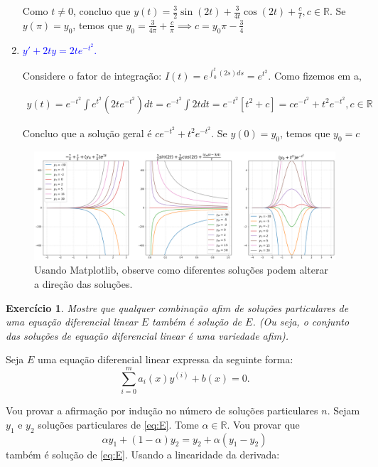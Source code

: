 \documentclass[a4paper,12pt]{article}
\theoremstyle{exer}
\newtheorem{exercise}{Exercício}
\theoremstyle{definition}
\newcommand{\enu}[1]{\textcolor{blue}{#1}}
\begin{document}
\begin{enumerate}
    Como $t \neq 0$, concluo que $y(t) = \frac{3}{2}\sin(2t) + \frac{3}{4t}\cos(2t) + \frac{c}{t}, c \in \mathbb{R}$.  Se $y(\pi) = y_0$, temos que $y_0 = \frac{3}{4\pi} + \frac{c}{\pi} \implies c = y_0\pi - \frac{3}{4}$ 


    \item \enu{$y' +2ty = 2te^{-t^2}$. }
    
    Considere o fator de integração: $I(t) = e^{\int_0^t (2s)ds} = e^{t^2}$. Como fizemos em a, 

    \begin{align}
    y(t) = e^{-t^2} \int e^{t^2}(2te^{-t^2})dt = e^{-t^2} \int 2t dt = e^{-t^2}[t^2 + c] = ce^{-t^2} + t^2e^{-t^2}, c \in \mathbb{R}
    \end{align}

    Concluo que a solução geral é $ce^{-t^2} + t^2e^{-t^2}$. Se $y(0) = y_0$, temos que $y_0 = c$

\end{enumerate}

\begin{figure}
    \centering
    \includegraphics[width=\textwidth]{images/exercise2.png}
    \caption{Usando Matplotlib, observe como diferentes soluções podem alterar a direção das soluções.}
\end{figure}

\begin{exercise}
    Mostre que qualquer combinação afim de soluções particulares de uma
    equação diferencial linear $E$ também é solução de $E$. (Ou seja, o
    conjunto das soluções de equação diferencial linear é uma variedade afim).
\end{exercise}

Seja $E$ uma equação diferencial linear expressa da seguinte forma:
\begin{equation}
    \label{eq:E}
    \sum_{i= 0}^m a_i(x)y^{(i)} + b(x) = 0.
\end{equation}

Vou provar a afirmação por indução no número de soluções particulares $n$.
Sejam $y_1$ e $y_2$ soluções particulares de \eqref{eq:E}. Tome
$\alpha \in \mathbb{R}$. Vou provar que 
$$\alpha y_1 + (1 - \alpha)y_2 = y_2 + \alpha(y_1 - y_2)$$ 
também é solução de \eqref{eq:E}. Usando a linearidade da derivada: 
\end{document}
